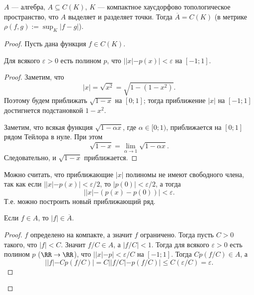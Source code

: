 \documentclass[12pt,a4paper]{article}
\begin{document}
    \begin{theorem}
        $A$ --- алгебра, $A \subseteq C(K)$, $K$ --- компактное хаусдорфово топологическое пространство, что $A$ выделяет и разделяет точки. Тогда $\overline{A} = C(K)$ (в метрике $\rho(f, g) := \sup_K |f - g|$).
    \end{theorem}

    \begin{proof}
        Пусть дана функция $f \in C(K)$.

        \begin{thlemma}
            Для всякого $\varepsilon > 0$ есть полином $p$, что $||x| - p(x)| < \varepsilon$ на $[-1; 1]$.
        \end{thlemma}

        \begin{proof}
            Заметим, что
            \[|x| = \sqrt{x^2} = \sqrt{1 - (1-x^2)}.\]
            Поэтому будем приближать $\sqrt{1 - x}$ на $[0; 1]$; тогда приближение $|x|$ на $[-1; 1]$ достигнется подстановкой $1-x^2$.

            Заметим, что всякая функция $\sqrt{1-\alpha x}$, где $\alpha \in [0; 1)$, приближается на $[0; 1]$ рядом Тейлора в нуле. При этом
            \[\sqrt{1-x} = \lim_{\alpha \to 1} \sqrt{1-\alpha x}.\]
            Следовательно, и $\sqrt{1-x}$ приближается.
        \end{proof}

        \begin{remark}
            Можно считать, что приближающие $|x|$ полиномы не имеют свободного члена, так как если $||x| - p(x)| < \varepsilon/2$, то $|p(0)| < \varepsilon/2$, а тогда
            \[||x| - (p(x) - p(0))| < \varepsilon.\]
            Т.е. можно построить новый приближающий ряд.
        \end{remark}

        \begin{thlemma}
            Если $f \in A$, то $|f| \in \overline{A}$.
        \end{thlemma}

        \begin{proof}
            $f$ определено на компакте, а значит $f$ ограничено. Тогда пусть $C > 0$ такого, что $|f| < C$. Значит $f/C \in A$, а $|f/C| < 1$. Тогда для всякого $\varepsilon > 0$ есть полином $p$ ($\RR \to \RR$), что $||x|-p| < \varepsilon/C$ на $[-1; 1]$. Тогда $Cp(f/C) \in A$, а
            \[||f|-Cp(f/C)| = C||f/C|-p(f/C)| \leqslant C (\varepsilon/C) = \varepsilon.\]
        \end{proof}


\end{proof}
\end{document}
